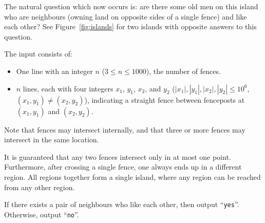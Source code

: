 The natural question which now occurs is:
are there some old men on this island who are neighbours (owning land on
opposite sides of a single fence) and like each other?
See Figure~\ref{fig:islands} for two islands with opposite answers to this question.

\begin{Input}
  The input consists of:
  \begin{itemize}
    \item One line with an integer $n$ ($3 \le n \le 1000$), the number of fences.
    \item $n$ lines, each with four integers $x_1$, $y_1$, $x_2$, and $y_2$
  ($\left|x_1\right|, \left|y_1\right|, \left|x_2\right|, \left|y_2\right|\leq 10^6$, $(x_1,y_1)\neq(x_2,y_2)$), indicating a straight fence between
  fenceposts at $(x_1,y_1)$ and $(x_2, y_2)$.
  \end{itemize}

  Note that fences may intersect internally, and that three or more fences may intersect in the same location.

  It is guaranteed that any two fences intersect only in at most one point.
  Furthermore, after crossing a single fence, one always ends up in a different region.
  All regions together form a single island, where any region can be reached from any other region.
\end{Input}

\begin{Output}
  If there exists a pair of neighbours who like each other, then output
  ``\texttt{yes}''. Otherwise, output ``\texttt{no}''.
\end{Output}
